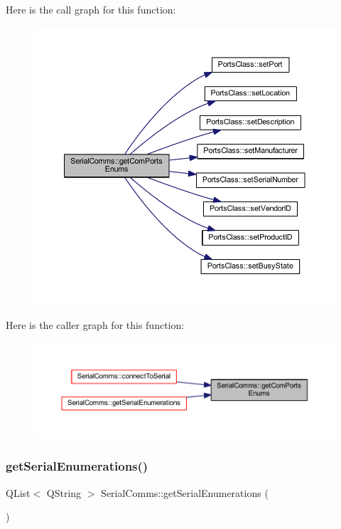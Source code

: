 Here is the call graph for this function\+:
\nopagebreak
\begin{figure}[H]
\begin{center}
\leavevmode
\includegraphics[width=350pt]{class_serial_comms_acea35603a9438747302b04f0b0a81312_cgraph}
\end{center}
\end{figure}
Here is the caller graph for this function\+:
\nopagebreak
\begin{figure}[H]
\begin{center}
\leavevmode
\includegraphics[width=350pt]{class_serial_comms_acea35603a9438747302b04f0b0a81312_icgraph}
\end{center}
\end{figure}
\mbox{\label{class_serial_comms_ab11ec2f342fc8543e7974a843fad67dd}} 
\subsubsection{\texorpdfstring{getSerialEnumerations()}{getSerialEnumerations()}}
{\footnotesize\ttfamily Q\+List$<$ Q\+String $>$ Serial\+Comms\+::get\+Serial\+Enumerations (\begin{DoxyParamCaption}{ }\end{DoxyParamCaption})}



